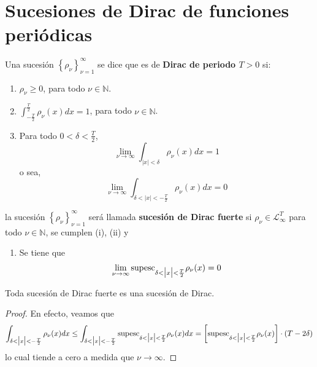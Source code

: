 \documentclass[12pt]{report}
\theoremstyle{largebreak}
\newcommand\abs[1]{\ensuremath{\big|#1\big|}}
\begin{document}
    \section{Sucesiones de Dirac de funciones periódicas}

    \begin{mydef}
        Una sucesión $\left\{\rho_\nu \right\}_{\nu=1}^\infty$ se dice que es de \textbf{Dirac de periodo $T>0$} si:
        \begin{enumerate}
            \item $\rho_\nu\geq0$, para todo $\nu\in\mathbb{N}$.
            \item $\int_{-\frac{T}{2}}^{\frac{T}{2}}\rho_\nu(x)dx=1$, para todo $\nu\in\mathbb{N}$.
            \item Para todo $0<\delta<\frac{T}{2}$,
            \begin{equation*}
                \lim_{\nu\rightarrow\infty}\int_{\abs{x}<\delta}\rho_\nu(x)dx=1
            \end{equation*}
            o sea,
            \begin{equation*}
                \lim_{\nu\rightarrow\infty}\int_{\delta<\abs{x}<-\frac{T}{2}}\rho_\nu(x)dx=0
            \end{equation*}
        \end{enumerate}
        la sucesión $\left\{\rho_\nu \right\}_{\nu=1}^\infty$ será llamada \textbf{sucesión de Dirac fuerte} si $\rho_\nu\in\mathcal{L}_\infty^T$ para todo $\nu\in\mathbb{N}$, se cumplen (i), (ii) y
        \begin{enumerate}
            \item Se tiene que
            \begin{equation*}
                \lim_{\nu\rightarrow\infty}\textup{supesc}_{\delta<\abs{x}<\frac{T}{2}}\rho_\nu(x)=0
            \end{equation*}
        \end{enumerate}
    \end{mydef}

    \begin{obs}
        Toda sucesión de Dirac fuerte es una sucesión de Dirac.
    \end{obs}

    \begin{proof}
        En efecto, veamos que
        \begin{equation*}
            \int_{\delta<\abs{x}<-\frac{T}{2}}\rho_\nu(x)dx\leq\int_{\delta<\abs{x}<-\frac{T}{2}}\textup{supesc}_{\delta<\abs{x}<\frac{T}{2}}\rho_\nu(x)dx=\left[\textup{supesc}_{\delta<\abs{x}<\frac{T}{2}}\rho_\nu(x) \right]\cdot\left(T-2\delta \right)
        \end{equation*}
        lo cual tiende a cero a medida que $\nu\rightarrow\infty$.
    \end{proof}
\end{document}
